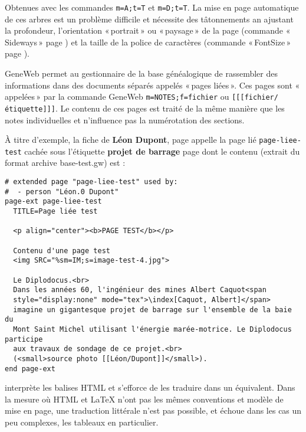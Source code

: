 \begin{description}[style=nextline]
\item[Arbres] Obtenues avec les commandes \verb|m=A;t=T| et \verb|m=D;t=T|.
La mise en page automatique de ces arbres est un problème difficile et
nécessite des tâtonnements an ajustant la profondeur, l'orientation «\,portrait\,»
ou «\,paysage\,» de la page (commande «\,Sideways\,» page \pageref{sideways}) et la
taille de la police de caractères (commande «\,FontSize\,» page \pageref{fontsize}).

\item[Pages liées] GeneWeb permet au gestionnaire de la base généalogique
de rassembler des informations dans des documents séparés appelés «\,pages liées\,».
Ces pages sont «\,appelées\,» par la commande GeneWeb \verb|m=NOTES;f=fichier| ou
\verb|[[[fichier/étiquette]]]|. Le contenu de ces pages est traité de la même
manière que les notes individuelles et n'influence pas la numérotation
des sections.

À titre d'exemple, la fiche de
{\bf Léon Dupont}, page \pageref{leondupont} appelle la page lié
\verb|page-liee-test| cachée sous l'étiquette {\bf projet de barrage}
page \pageref{pageliee} dont le contenu (extrait du format archive
base-test.gw) est :

\begin{verbatim}
# extended page "page-liee-test" used by:
#  - person "Léon.0 Dupont"
page-ext page-liee-test
  TITLE=Page liée test
  
  <p align="center"><b>PAGE TEST</b></p>
  
  Contenu d'une page test
  <img SRC="%sm=IM;s=image-test-4.jpg">
  
  Le Diplodocus.<br>
  Dans les années 60, l'ingénieur des mines Albert Caquot<span
  style="display:none" mode="tex">\index[Caquot, Albert]</span>
  imagine un gigantesque projet de barrage sur l'ensemble de la baie du
  Mont Saint Michel utilisant l'énergie marée-motrice. Le Diplodocus participe
  aux travaux de sondage de ce projet.<br>
  (<small>source photo [[Léon/Dupont]]</small>).
end page-ext
\end{verbatim}

\item[Autres pages] \gwtol{} interprète les balises HTML et s'efforce de
les traduire dans un équivalent. Dans la mesure où HTML et \LaTeX{} n'ont pas
les mêmes conventions et modèle de mise en page, une traduction littérale
n'est pas possible, et échoue dans les cas un peu complexes, les tableaux
en particulier.

\end{description}

